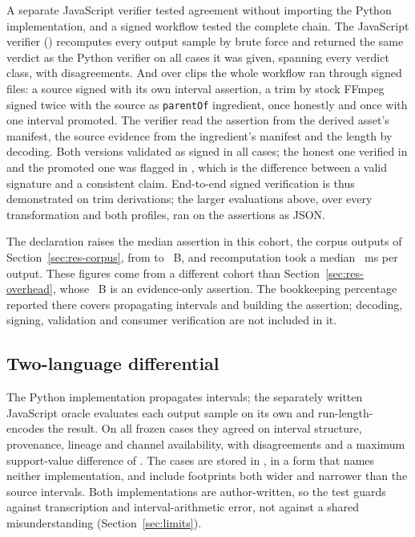 \documentclass[preprint,3p,11pt,authoryear]{elsarticle}
\begin{document}
A separate JavaScript verifier tested agreement without importing the Python
implementation, and a signed workflow tested the complete chain. The JavaScript
verifier () recomputes every output sample by brute
force and returned the same verdict as the Python verifier on all \PjsCases{} cases it was
given, spanning every verdict class, with \PjsDis{} disagreements. And over
\PtwoClips{} clips the whole workflow ran through signed files: a source signed with
its own interval assertion, a trim by stock FFmpeg signed twice with the source as
\texttt{parentOf} ingredient, once honestly and once with one interval promoted.
The verifier read the assertion from the derived asset's manifest, the source
evidence from the ingredient's manifest and the length by decoding. Both versions
validated as signed in all \PtwoWrongValid{} cases; the honest one verified in
\PtwoHonest{} and the promoted one was flagged in \PtwoWrongFlagged{}, which is the
difference between a valid signature and a consistent claim. End-to-end signed
verification is thus demonstrated on \PtwoClips{} trim derivations; the larger
evaluations above, over every transformation and both profiles, ran on the
assertions as JSON.

The declaration raises the median assertion in this cohort, the corpus outputs of
Section~\ref{sec:res-corpus}, from \PbytesPlain{} to \PbytesDecl{}~B, and recomputation took a
median \PverifyMs{}~ms per output. These figures come from a different cohort than Section~\ref{sec:res-overhead},
whose \Gassertion{}~B is an evidence-only assertion. The bookkeeping percentage
reported there covers propagating intervals and building the assertion; decoding,
signing, validation and consumer verification are not included in it.

\subsection{Two-language differential}
\label{sec:res-oracle}

The Python implementation propagates intervals; the separately written
JavaScript oracle evaluates each output sample on its own and run-length-encodes
the result. On all \Hcases{} frozen cases they agreed on interval structure,
provenance, lineage and channel availability, with \Hdis{} disagreements and a
maximum support-value difference of \Hdelta{}. The cases are stored in
, in a form that names neither
implementation, and include footprints both wider and narrower than the source
intervals. Both implementations are author-written, so the test guards against
transcription and interval-arithmetic error, not against a shared
misunderstanding (Section~\ref{sec:limits}).
\end{document}
